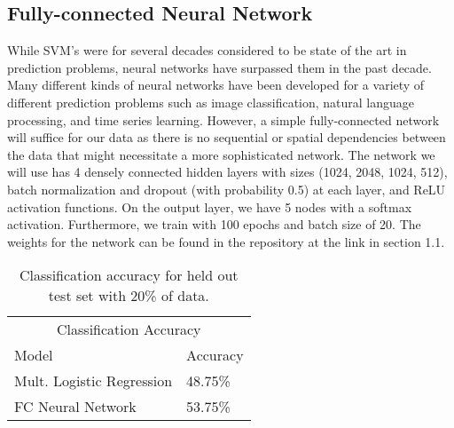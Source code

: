 \documentclass{article}
\begin{document}
\subsection{Fully-connected Neural Network}
While SVM's were for several decades considered to be state of the art in prediction problems, neural networks have surpassed them in the past decade. Many different kinds of neural networks have been developed for a variety of different prediction problems such as image classification, natural language processing, and time series learning. However, a simple fully-connected network will suffice for our data as there is no sequential or spatial dependencies between the data that might necessitate a more sophisticated network.
\newline\newline The network we will use has 4 densely connected hidden layers with sizes (1024, 2048, 1024, 512), batch normalization and dropout (with probability 0.5) at each layer, and ReLU activation functions. On the output layer, we have 5 nodes with a softmax activation. Furthermore, we train with 100 epochs and batch size of 20. The weights for the network can be found in the repository at the link in section 1.1.

\begin{table}[t]
  \caption{Classification accuracy for held out test set with 20\% of data.}
  \label{class_acc}
  \centering
  \begin{tabular}{ll}
    \toprule
    \multicolumn{2}{c}{Classification Accuracy}                   \\
    \cmidrule{1-2}
    Model  & Accuracy  \\
    \midrule
     Mult. Logistic Regression & 48.75\%\\
	 FC Neural Network & 53.75\% \\
    \bottomrule
  \end{tabular}
\end{table}
\end{document}
